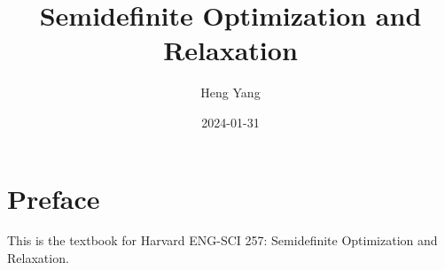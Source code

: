 \documentclass[
]{book}
\title{Semidefinite Optimization and Relaxation}
\author{Heng Yang}
\date{2024-01-31}
\theoremstyle{definition}
\theoremstyle{definition}
\theoremstyle{definition}
\theoremstyle{definition}
\theoremstyle{remark}
\begin{document}
\maketitle

{
\setcounter{tocdepth}{1}
\tableofcontents
}
\newcommand{\calQ}{\mathcal{Q}}
\newcommand{\calA}{\mathcal{A}}
\newcommand{\calK}{\mathcal{K}}
\newcommand{\mathx}{\mathrm{x}}
\newcommand{\mathy}{\mathrm{y}}

\newcommand{\Real}[1]{\mathbb{R}^{#1}}
\newcommand{\sym}[1]{\mathbb{S}^{#1}}
\newcommand{\psd}[1]{\sym{#1}_{+}}
\newcommand{\pd}[1]{\sym{#1}_{++}}
\newcommand{\inprod}[2]{\langle #1, #2 \rangle}
\newcommand{\linprod}[2]{\left\langle #1, #2 \right\rangle}
\newcommand{\trace}{\mathrm{tr}}
\newcommand{\tran}{^\top}

\newcommand{\rank}{\mathrm{rank}}
\newcommand{\diag}{\mathrm{diag}}
\newcommand{\Diag}{\mathrm{Diag}}
\newcommand{\BlkDiag}{\mathrm{BlkDiag}}
\newcommand{\vectorize}{\mathrm{vec}}
\newcommand{\svec}{\mathrm{svec}}
\newcommand{\mat}{\mathrm{mat}}
\newcommand{\smat}{\mathrm{smat}}
\newcommand{\norm}[1]{\Vert #1 \Vert}
\newcommand{\lnorm}[1]{\left\Vert #1 \right\Vert}
\newcommand{\pnorm}[2]{\Vert #1 \Vert_{#2}}
\newcommand{\Fnorm}[1]{\Vert #1 \Vert_\mathrm{F}}
\newcommand{\conv}{\mathrm{conv}}
\newcommand{\cone}{\mathrm{cone}}
\newcommand{\interior}{\mathrm{int}}
\newcommand{\relint}{\mathrm{ri}}
\newcommand{\poly}[1]{\mathbb{R}[#1]}
\newcommand{\SOd}{\mathrm{SO}(d)}
\newcommand{\SOthree}{\mathrm{SO}(3)}
\newcommand{\Od}{\mathrm{O}(d)}
\newcommand{\Ogroup}{\mathrm{O}}
\newcommand{\usphere}{\mathcal{S}}
\newcommand{\bmath}[1]{\boldsymbol{#1}}
\newcommand{\lbrkt}{[\![}
\newcommand{\rbrkt}{]\!]}
\newcommand{\brkt}[1]{\lbrkt #1 \rbrkt}

\newcommand{\cbrace}[1]{\{ #1 \}}
\newcommand{\lcbrace}[1]{ \left\{ #1 \right\} }
\newcommand{\aff}{\mathrm{aff}}
\newcommand{\bbN}{\mathbb{N}}
\newcommand{\dist}{\mathrm{dist}}
\newcommand{\subject}{\mathrm{s.t.}}
\newcommand{\cl}{\mathrm{cl}}
\newcommand{\eye}{\mathrm{I}}
\newcommand{\inv}{^{-1}}
\newcommand{\Range}{\mathrm{Range}}
\renewcommand{\ker}{\mathrm{ker}}
\newcommand{\face}{\mathrm{face}}
\newcommand{\lmid}{\ \middle\vert\ }

\hypertarget{preface}{%
\chapter*{Preface}\label{preface}}

This is the textbook for Harvard ENG-SCI 257: Semidefinite Optimization and Relaxation.
\end{document}

